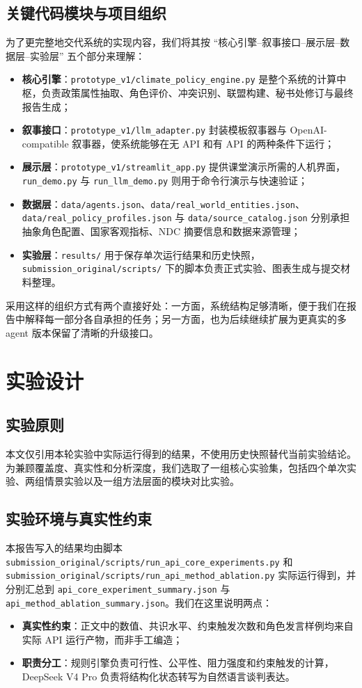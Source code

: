 \documentclass[12pt,a4paper]{ctexart}
\begin{document}
\subsection{关键代码模块与项目组织}
为了更完整地交代系统的实现内容，我们将其按 ``核心引擎--叙事接口--展示层--数据层--实验层'' 五个部分来理解：
\begin{itemize}
  \item \textbf{核心引擎}：\texttt{prototype\_v1/climate\_policy\_engine.py} 是整个系统的计算中枢，负责政策属性抽取、角色评价、冲突识别、联盟构建、秘书处修订与最终报告生成；
  \item \textbf{叙事接口}：\texttt{prototype\_v1/llm\_adapter.py} 封装模板叙事器与 OpenAI-compatible 叙事器，使系统能够在无 API 和有 API 的两种条件下运行；
  \item \textbf{展示层}：\texttt{prototype\_v1/streamlit\_app.py} 提供课堂演示所需的人机界面，\texttt{run\_demo.py} 与 \texttt{run\_llm\_demo.py} 则用于命令行演示与快速验证；
  \item \textbf{数据层}：\texttt{data/agents.json}、\texttt{data/real\_world\_entities.json}、\texttt{data/real\_policy\_profiles.json} 与 \texttt{data/source\_catalog.json} 分别承担抽象角色配置、国家客观指标、NDC 摘要信息和数据来源管理；
  \item \textbf{实验层}：\texttt{results/} 用于保存单次运行结果和历史快照，\texttt{submission\_original/scripts/} 下的脚本负责正式实验、图表生成与提交材料整理。
\end{itemize}
采用这样的组织方式有两个直接好处：一方面，系统结构足够清晰，便于我们在报告中解释每一部分各自承担的任务；另一方面，也为后续继续扩展为更真实的多 agent 版本保留了清晰的升级接口。

\section{实验设计}

\subsection{实验原则}
本文仅引用本轮实验中实际运行得到的结果，不使用历史快照替代当前实验结论。为兼顾覆盖度、真实性和分析深度，我们选取了一组核心实验集，包括四个单次实验、两组情景实验以及一组方法层面的模块对比实验。

\subsection{实验环境与真实性约束}
本报告写入的结果均由脚本 \texttt{submission\_original/scripts/run\_api\_core\_experiments.py} 和 \texttt{submission\_original/scripts/run\_api\_method\_ablation.py} 实际运行得到，并分别汇总到 \texttt{api\_core\_experiment\_summary.json} 与 \texttt{api\_method\_ablation\_summary.json}。我们在这里说明两点：
\begin{itemize}
  \item \textbf{真实性约束}：正文中的数值、共识水平、约束触发次数和角色发言样例均来自实际 API 运行产物，而非手工编造；
  \item \textbf{职责分工}：规则引擎负责可行性、公平性、阻力强度和约束触发的计算，DeepSeek V4 Pro 负责将结构化状态转写为自然语言谈判表达。
\end{itemize}
\end{document}
